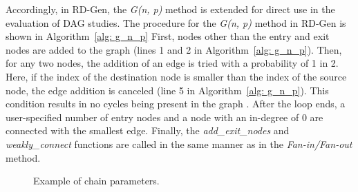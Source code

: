 Accordingly, in RD-Gen, the {\it G(n, p)} method is extended for direct use in the evaluation of DAG studies.
The procedure for the {\it G(n, p)} method in RD-Gen is shown in Algorithm~\ref{alg: g_n_p}
First, nodes other than the entry and exit nodes are added to the graph (lines 1 and 2 in Algorithm~\ref{alg: g_n_p}).
Then, for any two nodes, the addition of an edge is tried with a probability of 1 in 2.
Here, if the index of the destination node is smaller than the index of the source node, the edge addition is canceled (line 5 in Algorithm~\ref{alg: g_n_p}).
This condition results in no cycles being present in the graph \cite{voronov2021ai, agrawal2020hard}.
After the loop ends, a user-specified number of entry nodes and a node with an in-degree of 0 are connected with the smallest edge.
Finally, the {\it add\_exit\_nodes} and {\it weakly\_connect} functions are called in the same manner as in the {\it Fan-in/Fan-out} method.


\begin{figure}[tb]
    \centering
    \caption{Example of chain parameters.}
    \label{fig: chain_param_exam}
\end{figure}


